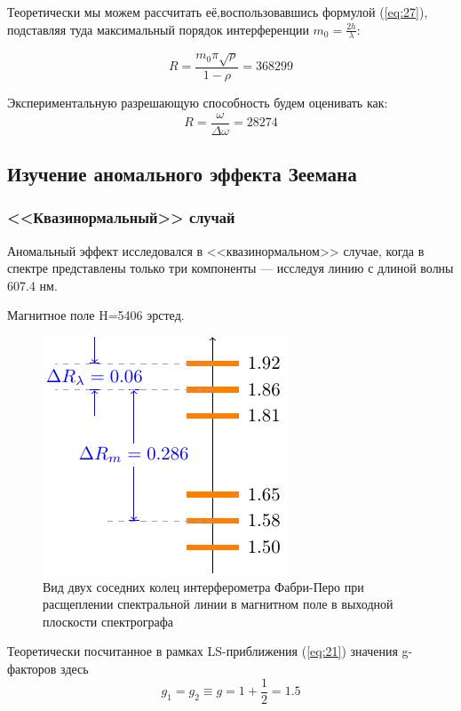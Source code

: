 Теоретически мы можем рассчитать её,воспользовавшись формулой (\ref{eq:27}), подставляя туда максимальный порядок интерференции $m_0=\frac{2h}{\lambda}$: 

\begin{equation} 
R=\frac{m_0\pi\sqrt{\rho}}{1-\rho}=368299 
\end{equation} 

Экспериментальную разрешающую способность будем оценивать как: 
\begin{equation} 
R=\frac{\omega}{\Delta \omega}=28274 
\end{equation}

\subsection{Изучение аномального эффекта Зеемана}

\subsubsection{<<Квазинормальный>> случай}

Аномальный эффект исследовался в <<квазинормальном>> случае, когда в спектре представлены только три компоненты --- исследуя линию с  длиной волны  607.4 нм.

Магнитное поле H=5406 эрстед.

\begin{figure}[H]
	\centering
	\includegraphics[scale=1]{ris/3b}
	\caption{Вид двух соседних колец интерферометра Фабри-Перо при расщеплении спектральной линии в магнитном поле в выходной плоскости спектрографа}
	\label{fig:ris3b}
\end{figure}

Теоретически посчитанное в рамках LS-приближения (\ref{eq:21}) значения  g-факторов здесь
\begin{equation}
	g_1=g_2\equiv g=1+\frac12=1.5
\end{equation}

